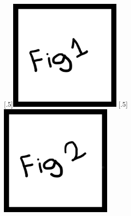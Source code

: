 \begin{figure}[!htb]
	\centering
		[.5\textwidth]{\includegraphics[width=0.5\textwidth,keepaspectratio]{Figures/ExampleFigure1.png}}%
		[.5\textwidth]{\includegraphics[width=0.5\textwidth,keepaspectratio]{Figures/ExampleFigure2.png}}
\end{figure}

